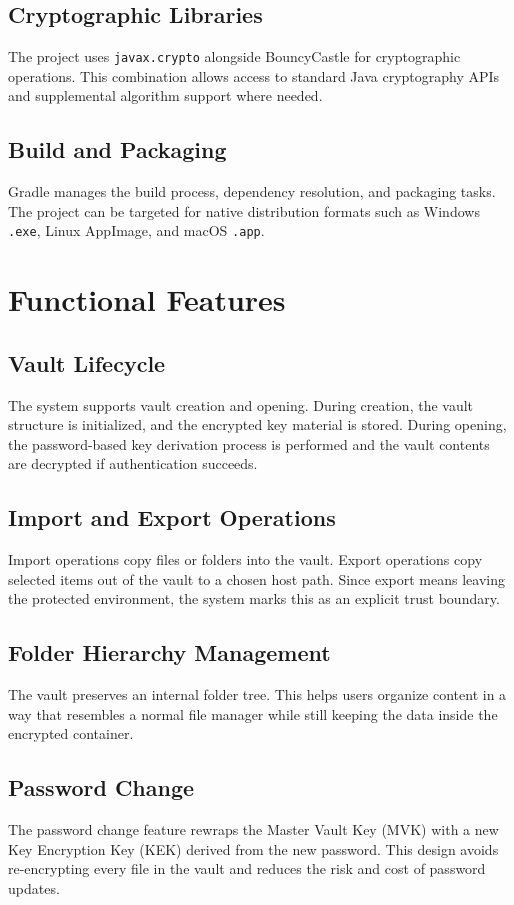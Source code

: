\documentclass[12pt,a4paper]{report}
\newcommand{\mvk}{Master Vault Key (MVK)}
\newcommand{\kek}{Key Encryption Key (KEK)}
\begin{document}
\section{Cryptographic Libraries}
The project uses \texttt{javax.crypto} alongside BouncyCastle for cryptographic operations. This combination allows access to standard Java cryptography APIs and supplemental algorithm support where needed.

\section{Build and Packaging}
Gradle manages the build process, dependency resolution, and packaging tasks. The project can be targeted for native distribution formats such as Windows \texttt{.exe}, Linux AppImage, and macOS \texttt{.app}.

\chapter{Functional Features}
\section{Vault Lifecycle}
The system supports vault creation and opening. During creation, the vault structure is initialized, and the encrypted key material is stored. During opening, the password-based key derivation process is performed and the vault contents are decrypted if authentication succeeds.

\section{Import and Export Operations}
Import operations copy files or folders into the vault. Export operations copy selected items out of the vault to a chosen host path. Since export means leaving the protected environment, the system marks this as an explicit trust boundary.

\section{Folder Hierarchy Management}
The vault preserves an internal folder tree. This helps users organize content in a way that resembles a normal file manager while still keeping the data inside the encrypted container.

\section{Password Change}
The password change feature rewraps the \mvk{} with a new \kek{} derived from the new password. This design avoids re-encrypting every file in the vault and reduces the risk and cost of password updates.
\end{document}
